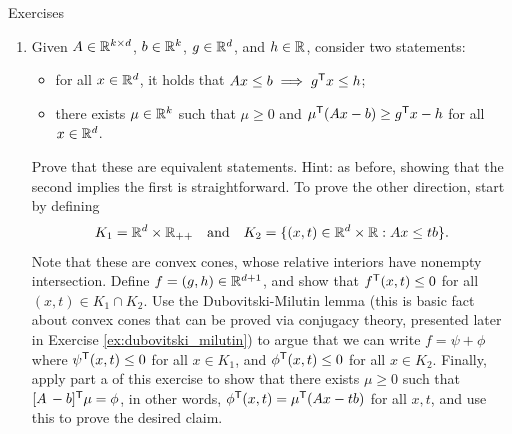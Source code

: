 \begin{xcb}{Exercises}
\begin{enumerate}[label=\thechapter.\arabic*]
\begin{enumerate}[label=\alph*.]
\item Given $A \in \mathbb{R}^{k \times d}$, $b \in \mathbb{R}^k$, $g \in \mathbb{R}^d$, and $h \in \mathbb{R}$,
  consider two statements: 
  \begin{itemize}
  \item for all $x \in \mathbb{R}^d$, it holds that $Ax \leq b \implies g^{\mathsf{T}} x \leq h$;  
  \item there exists $\mu \in \mathbb{R}^k$ such that $\mu \geq 0$ and $\mu^{\mathsf{T}} (Ax - b) 
    \geq g^{\mathsf{T}} x - h$ for all $x \in \mathbb{R}^d$.
  \end{itemize}
  Prove that these are equivalent statements. Hint: as before, showing that the
  second implies the first is straightforward. To prove the other direction,
  start by defining 
  \[
  K_1 = \mathbb{R}^d \times \mathbb{R}_{++} \quad \text{and} \quad K_2 = \{ (x,t) \in \mathbb{R}^d
  \times \mathbb{R}: Ax \leq tb \}.
  \]
  Note that these are convex cones, whose relative interiors have nonempty 
  intersection. Define $f = (g,h) \in \mathbb{R}^{d+1}$, and show that $f^{\mathsf{T}} (x,t) 
  \leq 0$ for all $(x,t) \in K_1 \cap K_2$. Use the Dubovitski-Milutin lemma     
  (this is basic fact about convex cones that can be proved via conjugacy
  theory, presented later in Exercise \ref{ex:dubovitski_milutin}) to argue that
  we can write $f = \psi + \phi$ where $\psi^{\mathsf{T}}(x,t) \leq 0$ for all $x \in
  K_1$, and $\phi^{\mathsf{T}} (x,t) \leq 0$ for all $x \in K_2$. Finally, apply part a of  
  this exercise to show that there exists $\mu \geq 0$ such that $[A \,
  -b]^{\mathsf{T}} \mu = \phi$, in other words, $\phi^{\mathsf{T}} (x,t) = \mu^{\mathsf{T}} (Ax - tb)$ for all
  $x,t$, and use this to prove the desired claim. 
\end{enumerate}


\end{enumerate}
\end{xcb}
